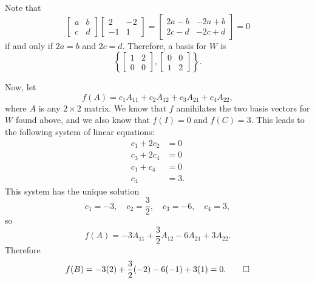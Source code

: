 \begin{solution}
  Note that
  \begin{equation*}
    \begin{bmatrix}
      a & b \\
      c & d
    \end{bmatrix}
    \begin{bmatrix}
      2 & -2 \\
      -1 & 1
    \end{bmatrix}
    =
    \begin{bmatrix}
      2a - b & -2a + b \\
      2c - d & -2c + d
    \end{bmatrix}
    = 0
  \end{equation*}
  if and only if $2a = b$ and $2c = d$. Therefore, a basis for $W$ is
  \begin{equation*}
    \left\{
      \begin{bmatrix}
        1 & 2 \\ 0 & 0
      \end{bmatrix},
      \begin{bmatrix}
        0 & 0 \\ 1 & 2
      \end{bmatrix}
    \right\}.
  \end{equation*}

  Now, let
  \begin{equation*}
    f(A) = c_1A_{11} + c_2A_{12} + c_3A_{21} + c_4A_{22},
  \end{equation*}
  where $A$ is any $2\times2$ matrix. We know that $f$ annihilates the
  two basis vectors for $W$ found above, and we also know that
  $f(I) = 0$ and $f(C) = 3$. This leads to the following system of
  linear equations:
  \begin{align*}
    c_1 + 2c_2 &= 0 \\
    c_3 + 2c_4 &= 0 \\
    c_1 + c_4 &= 0 \\
    c_4 &= 3.
  \end{align*}
  This system has the unique solution
  \begin{equation*}
    c_1 = -3, \quad
    c_2 = \frac32, \quad
    c_3 = -6, \quad
    c_4 = 3,
  \end{equation*}
  so
  \begin{equation*}
    f(A) = -3A_{11} + \frac32A_{12} - 6A_{21} + 3A_{22}.
  \end{equation*}
  Therefore
  \begin{equation*}
    f(B) = -3(2) + \frac32(-2) - 6(-1) + 3(1) = 0. \qedhere
  \end{equation*}
\end{solution}

